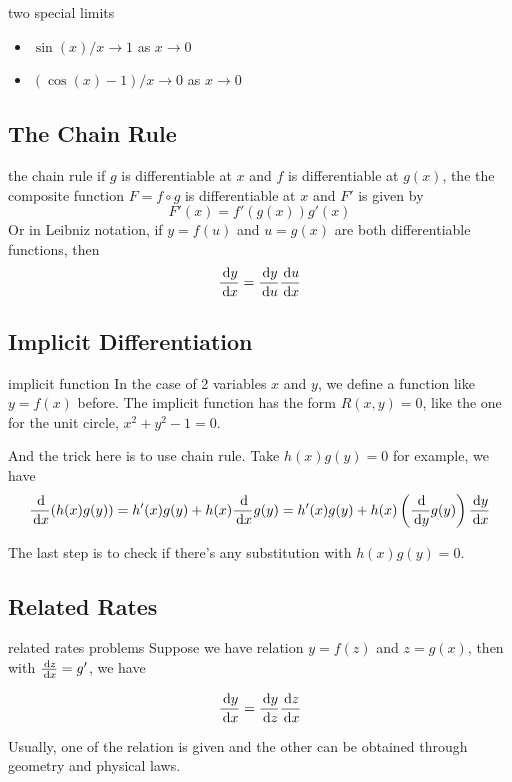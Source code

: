 \documentclass[Calculus 1 Recitation.tex]{subfiles}
\begin{document}
\begin{myleftlinebox}
	two special limits
	\tcblower
	\begin{itemize}
		\item $\sin(x)/x\to 1$ as $x\to 0$
		\item $(\cos(x)-1)/x\to 0$ as $x\to 0$
	\end{itemize}
\end{myleftlinebox}

\subsection{The Chain Rule}

\begin{myleftlinebox}
	the chain rule
	\tcblower
	if $g$ is differentiable at $x$ and $f$ is differentiable at $g(x)$, the the composite function $F=f\circ g$ is differentiable at $x$ and $F'$ is given by 
	\[F'(x)=f'(g(x))g'(x)\]
	Or in Leibniz notation, if $y=f(u)$ and $u=g(x)$ are both differentiable functions, then
	\[\frac{\,\mathrm{d} y}{\,\mathrm{d} x} = \frac{\,\mathrm{d} y}{\,\mathrm{d} u}\frac{\,\mathrm{d} u}{\,\mathrm{d} x}\]
\end{myleftlinebox}

\subsection{Implicit Differentiation}
\begin{myleftlinebox}
	implicit function
	\tcblower
	In the case of 2 variables $x$ and $y$, we define a function like $y=f(x)$ before. The implicit function has the form $R(x,y)=0$, like the one for the unit circle, $x^2+y^2-1=0$.

	And the trick here is to use chain rule. Take $h(x)g(y)=0$ for example, we have
	\[\frac{\,\mathrm{d}}{\,\mathrm{d} x} (h(x)g(y))=h'(x)g(y)+h(x)\frac{\,\mathrm{d}}{\,\mathrm{d} x} g(y)=h'(x)g(y)+h(x)\left( \frac{\,\mathrm{d}}{\,\mathrm{d} y} g(y) \right) \frac{\,\mathrm{d} y}{\,\mathrm{d} x}\]
	
	The last step is to check if there's any substitution with $h(x)g(y)=0$.
\end{myleftlinebox}

\subsection{Related Rates}

\begin{myleftlinebox}
	related rates problems
	\tcblower
	Suppose we have relation $y=f(z)$ and $z=g(x)$, then with $\frac{\,\mathrm{d} z}{\,\mathrm{d} x}=g'$, we have

	\[\frac{\,\mathrm{d} y}{\,\mathrm{d} x}=\frac{\,\mathrm{d} y}{\,\mathrm{d} z}\frac{\,\mathrm{d} z}{\,\mathrm{d} x}\]
	
	Usually, one of the relation is given and the other can be obtained through geometry and physical laws.
\end{myleftlinebox}
\end{document}
